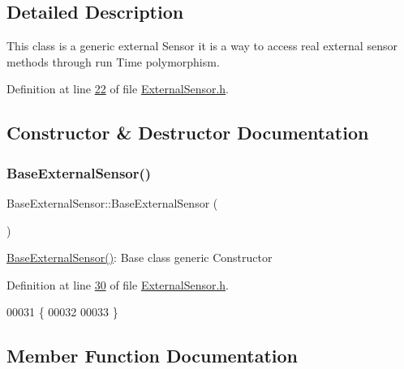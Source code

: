 \subsection{Detailed Description}
This class is a generic external Sensor it is a way to access real external sensor methods through run Time polymorphism. 

Definition at line \hyperlink{_external_sensor_8h_source_l00022}{22} of file \hyperlink{_external_sensor_8h_source}{External\+Sensor.\+h}.



\subsection{Constructor \& Destructor Documentation}
\mbox{\label{class_base_external_sensor_a978d96a6563b646efb358c2790a9fc6f}} 
\subsubsection{\texorpdfstring{Base\+External\+Sensor()}{BaseExternalSensor()}}
{\footnotesize\ttfamily Base\+External\+Sensor\+::\+Base\+External\+Sensor (\begin{DoxyParamCaption}{ }\end{DoxyParamCaption})\hspace{0.3cm}{\ttfamily [inline]}}

\hyperlink{class_base_external_sensor_a978d96a6563b646efb358c2790a9fc6f}{Base\+External\+Sensor()}\+: Base class generic Constructor 

Definition at line \hyperlink{_external_sensor_8h_source_l00030}{30} of file \hyperlink{_external_sensor_8h_source}{External\+Sensor.\+h}.


\begin{DoxyCode}
00031     \{
00032     
00033     \}
\end{DoxyCode}


\subsection{Member Function Documentation}
\mbox{\label{class_base_external_sensor_a87d132803d4f4fdd4e66332809f0c9a0}} 
